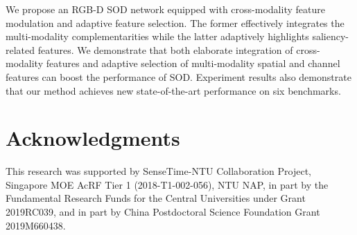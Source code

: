 \documentclass[runningheads]{llncs}
\begin{document}
We propose an RGB-D SOD network equipped with cross-modality feature modulation and adaptive feature selection.
The former effectively integrates the multi-modality complementarities while the latter adaptively highlights saliency-related features.
We demonstrate that both elaborate integration of cross-modality features  and adaptive selection of multi-modality spatial and channel features can boost the performance of SOD. Experiment results also demonstrate that our method achieves new state-of-the-art performance on six benchmarks.

\section*{Acknowledgments}
This research was supported by SenseTime-NTU Collaboration Project, Singapore MOE AcRF Tier 1 (2018-T1-002-056), NTU NAP, in part by the Fundamental Research Funds for the Central Universities under Grant 2019RC039, and in part by China Postdoctoral Science Foundation Grant 2019M660438.



\end{document}
